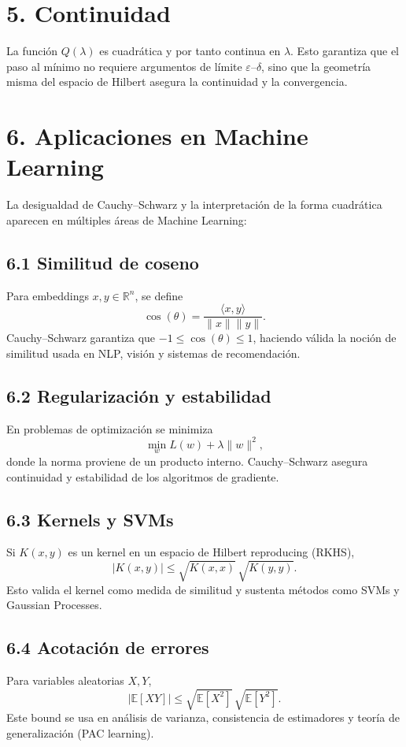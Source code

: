 \documentclass[12pt]{article}
\begin{document}
\section*{5. Continuidad}
La función $Q(\lambda)$ es cuadrática y por tanto continua en $\lambda$. 
Esto garantiza que el paso al mínimo no requiere argumentos de límite $\varepsilon$--$\delta$, 
sino que la geometría misma del espacio de Hilbert asegura la continuidad y la convergencia.


\section*{6. Aplicaciones en Machine Learning}

La desigualdad de Cauchy--Schwarz y la interpretación de la forma cuadrática 
aparecen en múltiples áreas de Machine Learning:

\subsection*{6.1 Similitud de coseno}
Para embeddings $x,y \in \mathbb{R}^n$, se define
\[
\cos(\theta) = \frac{\langle x,y\rangle}{\|x\|\|y\|}.
\]
Cauchy--Schwarz garantiza que $-1 \leq \cos(\theta) \leq 1$, 
haciendo válida la noción de similitud usada en NLP, visión y sistemas de recomendación.

\subsection*{6.2 Regularización y estabilidad}
En problemas de optimización se minimiza
\[
\min_w L(w) + \lambda \|w\|^2,
\]
donde la norma proviene de un producto interno. 
Cauchy--Schwarz asegura continuidad y estabilidad de los algoritmos de gradiente.

\subsection*{6.3 Kernels y SVMs}
Si $K(x,y)$ es un kernel en un espacio de Hilbert reproducing (RKHS),
\[
|K(x,y)| \leq \sqrt{K(x,x)} \, \sqrt{K(y,y)}.
\]
Esto valida el kernel como medida de similitud y sustenta métodos como SVMs y Gaussian Processes.

\subsection*{6.4 Acotación de errores}
Para variables aleatorias $X,Y$,
\[
|\mathbb{E}[XY]| \leq \sqrt{\mathbb{E}[X^2]} \, \sqrt{\mathbb{E}[Y^2]}.
\]
Este bound se usa en análisis de varianza, consistencia de estimadores 
y teoría de generalización (PAC learning).
\end{document}
